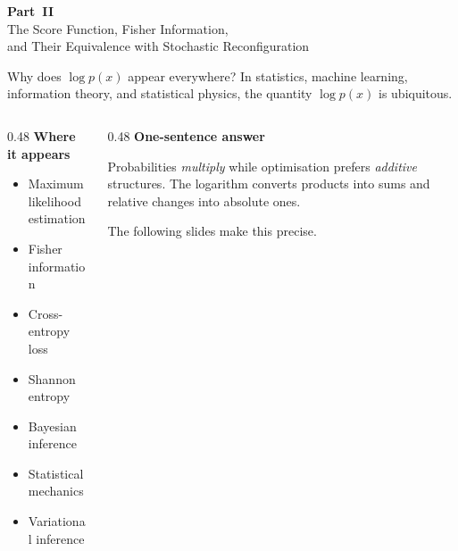 \documentclass[aspectratio=169]{beamer}
\begin{document}

\begin{frame}{}
\vfill
\begin{center}
{\Large\bfseries Part~II}\\[10pt]
{\large The Score Function, Fisher Information,\\[4pt]
and Their Equivalence with Stochastic Reconfiguration}
\end{center}
\vfill
\end{frame}


\begin{frame}{Why does \(\log p(x)\) appear everywhere?}
In statistics, machine learning, information theory, and statistical
physics, the quantity \(\log p(x)\) is ubiquitous.

\medskip

\begin{columns}[T]
\begin{column}{0.48\textwidth}
\textbf{Where it appears}
\begin{itemize}
  \item Maximum likelihood estimation
  \item Fisher information
  \item Cross-entropy loss
  \item Shannon entropy
  \item Bayesian inference
  \item Statistical mechanics
  \item Variational inference
\end{itemize}
\end{column}
\begin{column}{0.48\textwidth}
\textbf{One-sentence answer}

Probabilities \emph{multiply} while optimisation prefers
\emph{additive} structures.
The logarithm converts products into sums and relative
changes into absolute ones.

\medskip

The following slides make this precise.
\end{column}
\end{columns}
\end{frame}
\end{document}
